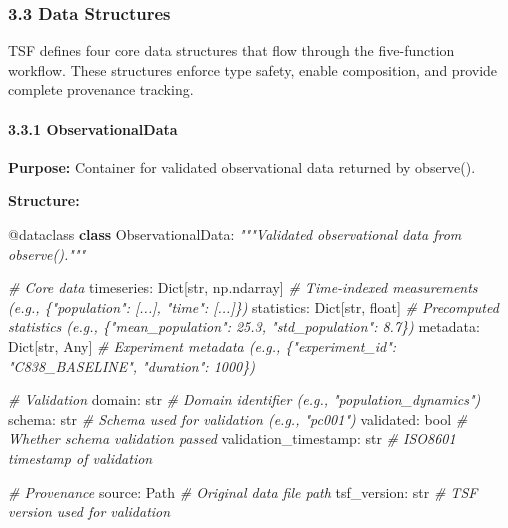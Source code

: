 \documentclass[
]{article}
\newenvironment{Shaded}{}{}
\newcommand{\AttributeTok}[1]{\textcolor[rgb]{0.49,0.56,0.16}{#1}}
\newcommand{\BuiltInTok}[1]{\textcolor[rgb]{0.00,0.50,0.00}{#1}}
\newcommand{\CommentTok}[1]{\textcolor[rgb]{0.38,0.63,0.69}{\textit{#1}}}
\newcommand{\KeywordTok}[1]{\textcolor[rgb]{0.00,0.44,0.13}{\textbf{#1}}}
\newcommand{\NormalTok}[1]{#1}
\begin{document}
\subsubsection{3.3 Data Structures}\label{data-structures}

TSF defines four core data structures that flow through the
five-function workflow. These structures enforce type safety, enable
composition, and provide complete provenance tracking.

\paragraph{3.3.1 ObservationalData}\label{observationaldata}

\textbf{Purpose:} Container for validated observational data returned by
observe().

\textbf{Structure:}

\begin{Shaded}
\begin{Highlighting}[]
\AttributeTok{@dataclass}
\KeywordTok{class}\NormalTok{ ObservationalData:}
    \CommentTok{"""Validated observational data from observe()."""}

    \CommentTok{\# Core data}
\NormalTok{    timeseries: Dict[}\BuiltInTok{str}\NormalTok{, np.ndarray]      }\CommentTok{\# Time{-}indexed measurements (e.g., \{"population": [...], "time": [...]\})}
\NormalTok{    statistics: Dict[}\BuiltInTok{str}\NormalTok{, }\BuiltInTok{float}\NormalTok{]           }\CommentTok{\# Precomputed statistics (e.g., \{"mean\_population": 25.3, "std\_population": 8.7\})}
\NormalTok{    metadata: Dict[}\BuiltInTok{str}\NormalTok{, Any]               }\CommentTok{\# Experiment metadata (e.g., \{"experiment\_id": "C838\_BASELINE", "duration": 1000\})}

    \CommentTok{\# Validation}
\NormalTok{    domain: }\BuiltInTok{str}                            \CommentTok{\# Domain identifier (e.g., "population\_dynamics")}
\NormalTok{    schema: }\BuiltInTok{str}                            \CommentTok{\# Schema used for validation (e.g., "pc001")}
\NormalTok{    validated: }\BuiltInTok{bool}                        \CommentTok{\# Whether schema validation passed}
\NormalTok{    validation\_timestamp: }\BuiltInTok{str}              \CommentTok{\# ISO8601 timestamp of validation}

    \CommentTok{\# Provenance}
\NormalTok{    source: Path                           }\CommentTok{\# Original data file path}
\NormalTok{    tsf\_version: }\BuiltInTok{str}                       \CommentTok{\# TSF version used for validation}
\end{Highlighting}
\end{Shaded}
\end{document}
